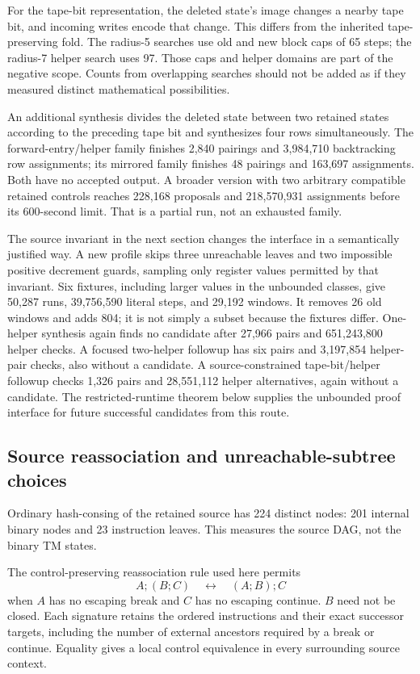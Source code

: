 For the tape-bit representation, the deleted state's image changes a nearby
tape bit, and incoming writes encode that change. This differs from the
inherited tape-preserving fold. The radius-5 searches use old and new block
caps of 65 steps; the radius-7 helper search uses 97. Those caps and helper
domains are part of the negative scope. Counts from overlapping searches
should not be added as if they measured distinct mathematical possibilities.

An additional synthesis divides the deleted state between two retained states
according to the preceding tape bit and synthesizes four rows simultaneously.
The forward-entry/helper family finishes 2,840 pairings and 3,984,710
backtracking row assignments; its mirrored family finishes 48 pairings and
163,697 assignments. Both have no accepted output. A broader version with
two arbitrary compatible retained controls reaches 228,168 proposals and
218,570,931 assignments before its 600-second limit. That is a partial run,
not an exhausted family.

The source invariant in the next section changes the interface in a
semantically justified way. A new profile skips three unreachable leaves
and two impossible positive decrement guards, sampling only register values
permitted by that invariant. Six fixtures, including larger values in the
unbounded classes, give 50,287 runs, 39,756,590 literal steps, and 29,192
windows. It removes 26 old windows and adds 804; it is not simply a subset
because the fixtures differ. One-helper synthesis again finds no candidate
after 27,966 pairs and 651,243,800 helper checks. A focused two-helper followup
has six pairs and 3,197,854 helper-pair checks, also without a candidate. A
source-constrained tape-bit/helper followup checks 1,326 pairs and 28,551,112
helper alternatives, again without a candidate. The restricted-runtime
theorem below supplies the unbounded proof interface for future successful
candidates from this route.

\subsection{Source reassociation and unreachable-subtree choices}

Ordinary hash-consing of the retained source has 224 distinct nodes:
201 internal binary nodes and 23 instruction leaves. This measures the
source DAG, not the binary TM states.

The control-preserving reassociation rule used here permits
\[
 A;(B;C)\quad\longleftrightarrow\quad(A;B);C
\]
when $A$ has no escaping break and $C$ has no escaping continue.
$B$ need not be closed. Each signature retains the ordered instructions and
their exact successor targets, including the number of external ancestors
required by a break or continue. Equality gives a local control equivalence
in every surrounding source context.

